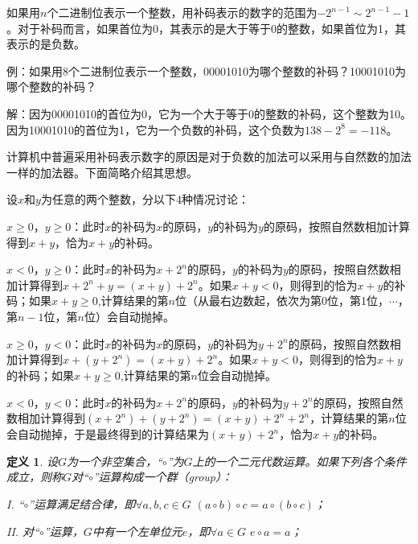\documentclass{article}
\newtheorem{Def}{定义}
\begin{document}
\begin{CJK*}{UTF8}{gbsn}
如果用$n$个二进制位表示一个整数，用补码表示的数字的范围为$-2^{n-1}\sim 2^{n-1}-1$。对于补码而言，如果首位为0，其表示的是大于等于0的整数，如果首位为1，其表示的是负数。

例：如果用8个二进制位表示一个整数，00001010为哪个整数的补码？10001010为哪个整数的补码？

解：因为00001010的首位为0，它为一个大于等于0的整数的补码，这个整数为10。因为10001010的首位为1，它为一个负数的补码，这个负数为$138-2^8=-118$。

计算机中普遍采用补码表示数字的原因是对于负数的加法可以采用与自然数的加法一样的加法器。下面简略介绍其思想。

设$x$和$y$为任意的两个整数，分以下4种情况讨论：

$x\geq 0$，$y\geq 0$：此时$x$的补码为$x$的原码，$y$的补码为$y$的原码，按照自然数相加计算得到$x+y$，恰为$x+y$的补码。

$x < 0$，$y \geq 0$：此时$x$的补码为$x+2^n$的原码，$y$的补码为$y$的原码，按照自然数相加计算得到$x+2^n+y=(x+y)+2^n$。如果$x+y<0$，则得到的恰为$x+y$的补码；如果$x+y\geq0$,计算结果的第$n$位（从最右边数起，依次为第0位，第1位，$\cdots$，第$n-1$位，第$n$位）会自动抛掉。

$x \geq 0$，$y < 0$：此时$x$的补码为$x$的原码，$y$的补码为$y+2^n$的原码，按照自然数相加计算得到$x+(y+2^n)=(x+y)+2^n$。如果$x+y<0$，则得到的恰为$x+y$的补码；如果$x+y\geq0$,计算结果的第$n$位会自动抛掉。

$x < 0$，$y < 0$：此时$x$的补码为$x+2^n$的原码，$y$的补码为$y+2^n$的原码，按照自然数相加计算得到$(x+2^n)+(y+2^n)=(x+y)+2^n + 2^n$，计算结果的第$n$位会自动抛掉，于是最终得到的计算结果为$(x+y)+2^n$，恰为$x+y$的补码。

\begin{Def}
  设$G$为一个非空集合，“$\circ$”为$G$上的一个二元代数运算。如果下列各个条件成立，则称$G$对“$\circ$”运算构成一个群（group）：

  I. “$\circ$”运算满足结合律，即$\forall a,b,c \in G$ $(a\circ b)\circ c = a\circ(b\circ c)$；

  II. 对“$\circ$”运算，$G$中有一个左单位元$e$，即$\forall a\in G$ $e\circ a = a$；


\end{Def}
\end{CJK*}
\end{document}
